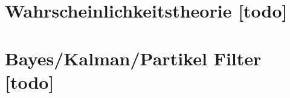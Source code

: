 \begin{comment}
------------------------------------------------------------------------------------------
- Theorie: Wahrscheinlichkeitsverfahren
	- Positionsschätzer in Form einer Wahrscheinlichkeitsverteilung über den Zustandraum.
	- Kalman fitering
		- Multivariate Gaussian distribution (Mehrdimensionale Normalverteilung)
		- \url{https://de.wikipedia.org/wiki/Mehrdimensionale_Normalverteilung}
		- Kompakte Beschreibung der Normalverteilung über den Erwartungswert $\mu$ und die Kovarianzmatrix $\Sigma$ ($\mu$ und $\sigma^2$)
		- \url{https://matheguru.com/stochastik/normalverteilung.html}
	- Markov methods
		- Probability Grid
		- Robot--Position ist diskretisiert
		- Nutzen von Bayes Rule um Grids zu kombinieren/neuerzeugen
	- Monte Carlo Lokalisierung
		- Multimodal Distribution for position estimation
		- Important Sampling
\end{comment}
\section{Wahrscheinlichkeitstheorie [todo]}


\begin{comment}
------------------------------------------------------------------------------------------
- Theorie: Lokalisierungsprobleme
	- Statische Lokalisierung
		- Akkurate Schätzung seiner globalen Position anhand der Sensordaten
		- Annahme: Umgebungskarte der Landmarken ist vorhanden
	- Position Tracking/Positionsverfolgung
		- Initiale Position ist gegeben
		- Verfogenden der Roboterposition
		- Annahme: Umgebungskarte der Landmarken ist vorhanden
	- SLAM
		- Verwenden der Sensordaten um sich zu Lokalisierung...
		- und eine Karte der Landmarken zu erzeugen.
		- Bisher Winkel und Entferung zu einer Landmarke gegeben
			- Computer Vision, Structure from Motion
		- Hier nur die Entfernung
\end{comment}
\section{Bayes/Kalman/Partikel Filter [todo]}


